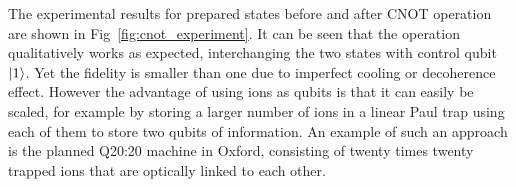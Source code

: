 The experimental results for prepared states before and after CNOT operation are
shown in Fig~\ref{fig:cnot_experiment}. It can be seen that the operation
qualitatively works as expected, interchanging the two states with control qubit
$\ket{1}$. Yet the fidelity is smaller than one due to imperfect cooling or
decoherence effect. However the advantage of using ions as qubits is
that it can easily be scaled, for example by storing a larger number of ions in
a linear Paul trap using each of them to store two qubits of information. An
example of such an approach is the planned Q20:20 machine in Oxford, consisting
of twenty times twenty trapped ions that are optically linked to each
other\cite{walmsley2016}.
